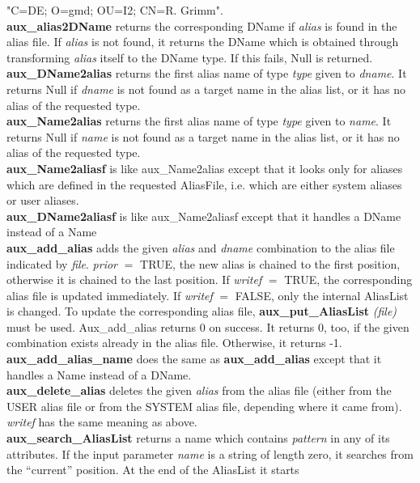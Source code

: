 "C=DE; O=gmd; OU=I2; CN=R. Grimm".
\\ [1em]
{\bf aux\_alias2DName} returns the corresponding DName if {\em alias} is found in
the alias file. If {\em alias} is not found, 
it returns the DName which is obtained
through transforming {\em alias} itself to the DName type. If this fails, Null is
returned.
\\ [1em]
{\bf aux\_DName2alias} returns the first alias name of type {\em type} given to {\em dname}.
It returns Null if {\em dname} is not found as a target name in the alias list, 
or it has no
alias of the requested type. 
\\ [1em]
{\bf aux\_Name2alias} returns the first alias name of type {\em type} given to {\em name}.
It returns Null if {\em name} is not found as a target name in the alias list, 
or it has no
alias of the requested type. 
\\ [1em]
{\bf aux\_Name2aliasf} is like aux\_Name2alias except that it looks only for aliases
which are defined in the requested AliasFile, i.e. which are either system aliases
or user aliases. 
\\ [1em]
{\bf aux\_DName2aliasf} is like aux\_Name2aliasf except that it handles a DName
instead of a Name
\\ [1em]
{\bf aux\_add\_alias} adds the given {\em alias} and {\em dname} combination to
the alias file indicated by {\em file}. {\em prior} $=$ TRUE, the new alias is
chained to the first position, otherwise it is chained to the last position.
If {\em writef} $=$ TRUE, the corresponding alias file is updated immediately.
If {\em writef} $=$ FALSE, only the internal AliasList is changed. To update
the corresponding alias file, {\bf aux\_put\_AliasList} {\em (file)} must be
used. Aux\_add\_alias returns 0 on success. It returns 0, too, if the
given combination exists already in the alias file. Otherwise, it returns -1.
\\ [1em]
{\bf aux\_add\_alias\_name} does the same as {\bf aux\_add\_alias} except that
it handles a Name instead of a DName.
\\ [1em]
{\bf aux\_delete\_alias} deletes the given {\em alias} from the alias file (either from
the USER alias file or from the SYSTEM alias file, depending where it came from).
{\em writef} has the same meaning as above.
\\ [1em]
{\bf aux\_search\_AliasList} returns a name which contains {\em pattern} in any of
its attributes. If the input parameter {\em name} is a string of length zero,
it searches from the ``current'' position. At the end of the AliasList it starts
